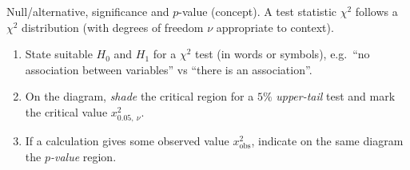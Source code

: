\documentclass[11pt]{article}
\def\textbf#1{#1}%
\newcounter{question}
\begin{document}
\begin{question}
\textbf{Null/alternative, significance and $p$-value (concept).} A test statistic $\chi^2$ follows a $\chi^2$ distribution
(with degrees of freedom $\nu$ appropriate to context).

\begin{enumerate}
  \item State suitable $H_0$ and $H_1$ for a $\chi^2$ test (in words or symbols), e.g.\ “no association between variables” vs “there is an association”.
  \item On the diagram, \emph{shade} the \textbf{critical region} for a $5\%$ \emph{upper-tail} test and mark the critical value $x^2_{0.05,\ \nu}$.
  \item If a calculation gives some observed value $x^2_{\text{obs}}$, indicate on the same diagram the \emph{$p$-value} region.
\end{enumerate}

\begin{center}
\end{center}
\end{question}
\end{document}
